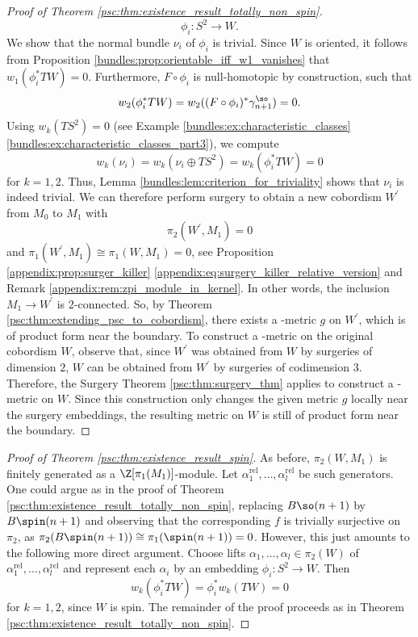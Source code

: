 \begin{proof}[Proof of Theorem \ref{psc:thm:existence_result_totally_non_spin}]
\[
\phi_i \colon S^2 \to W.
\]
We show that the normal bundle $\nu_i$ of $\phi_i$ is trivial. Since $W$ is oriented, it follows from Proposition \ref{bundles:prop:orientable_iff_w1_vanishes} that $w_1(\phi_i^\ast TW) = 0$. Furthermore, $F\circ \phi_i$ is null-homotopic by construction, such that 
\[
w_2(\phi_i^\ast TW) = w_2 ((F \circ \phi_i)^\ast \gamma_{n+1}^\so) = 0.
\]
Using $w_k(TS^2) = 0$ (see Example \ref{bundles:ex:characteristic_classes} \ref{bundles:ex:characteristic_classes_part3}), we compute
\[
w_k(\nu_i) = w_k(\nu_i \oplus TS^2) = w_k(\phi_i^\ast TW) = 0
\]
for $k = 1,2$. Thus, Lemma \ref{bundles:lem:criterion_for_triviality} shows that $\nu_i$ is indeed trivial. We can therefore perform surgery to obtain a new cobordism $W^\prime$ from $M_0$ to $M_1$ with 
\[
\pi_2(W^\prime,M_1) = 0
\]
and $\pi_1(W^\prime,M_1) \cong \pi_1(W,M_1) = 0$, see Proposition \ref{appendix:prop:surger_killer} \ref{appendix:eq:surgery_killer_relative_version} and Remark \ref{appendix:rem:zpi_module_in_kernel}. In other words, the inclusion $M_1 \to W^\prime$ is $2$-connected. So, by Theorem \ref{psc:thm:extending_psc_to_cobordism}, there exists a \psc-metric $g$ on $W^\prime$, which is of product form near the boundary. To construct a \psc-metric on the original cobordism $W$, observe that, since $W^\prime$ was obtained from $W$ by surgeries of dimension $2$, $W$ can be obtained from $W^\prime$ by surgeries of codimension $3$. Therefore, the Surgery Theorem \ref{psc:thm:surgery_thm} applies to construct a \psc-metric on $W$. Since this construction only changes the given metric $g$ locally near the surgery embeddings, the resulting metric on $W$ is still of product form near the boundary.
\end{proof}

\begin{proof}[Proof of Theorem \ref{psc:thm:existence_result_spin}]
    As before, $\pi_2(W,M_1)$ is finitely generated as a $\Z[\pi_1(M_1)]$-module. Let $\alpha_1^\mathrm{rel},\ldots, \alpha_l^\mathrm{rel}$ be such generators. One could argue as in the proof of Theorem \ref{psc:thm:existence_result_totally_non_spin}, replacing $B\so(n+1)$ by $B\spin(n+1)$ and observing that the corresponding $f$ is trivially surjective on $\pi_2$, as $\pi_2(B\spin(n+1)) \cong \pi_1(\spin(n+1)) = 0$. However, this just amounts to the following more direct argument. Choose lifts $\alpha_1,\ldots,\alpha_l \in \pi_2(W)$ of $\alpha_1^\mathrm{rel},\ldots,\alpha_l^\mathrm{rel}$ and represent each $\alpha_i$ by an embedding $\phi_i \colon S^2 \to W$. Then
    \[
    w_k(\phi_i^\ast TW) = \phi_i^\ast w_k(TW) = 0
    \]
    for $k = 1,2$, since $W$ is spin. The remainder of the proof proceeds as in Theorem \ref{psc:thm:existence_result_totally_non_spin}.
\end{proof}

